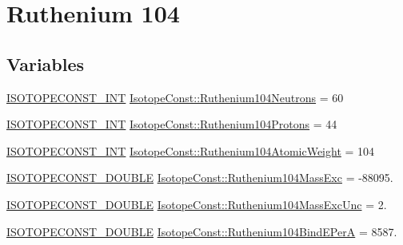 \hypertarget{group___isotope_const-_ruthenium-_ru104}{}\section{Ruthenium 104}
\label{group___isotope_const-_ruthenium-_ru104}
\subsection*{Variables}
\begin{DoxyCompactItemize}
\item 
\mbox{\hyperlink{group___isotope_const-_macros_ga5f18360b3e99483a35c32d789e62621c}{I\+S\+O\+T\+O\+P\+E\+C\+O\+N\+S\+T\+\_\+\+I\+NT}} \mbox{\hyperlink{group___isotope_const-_ruthenium-_ru104_ga290d6c23257a478cd0587c20491e41c3}{Isotope\+Const\+::\+Ruthenium104\+Neutrons}} = 60
\item 
\mbox{\hyperlink{group___isotope_const-_macros_ga5f18360b3e99483a35c32d789e62621c}{I\+S\+O\+T\+O\+P\+E\+C\+O\+N\+S\+T\+\_\+\+I\+NT}} \mbox{\hyperlink{group___isotope_const-_ruthenium-_ru104_gae25937feedf29162c135adbff67fa4ce}{Isotope\+Const\+::\+Ruthenium104\+Protons}} = 44
\item 
\mbox{\hyperlink{group___isotope_const-_macros_ga5f18360b3e99483a35c32d789e62621c}{I\+S\+O\+T\+O\+P\+E\+C\+O\+N\+S\+T\+\_\+\+I\+NT}} \mbox{\hyperlink{group___isotope_const-_ruthenium-_ru104_ga3aaffc4020ab8aff445eb86447915461}{Isotope\+Const\+::\+Ruthenium104\+Atomic\+Weight}} = 104
\item 
\mbox{\hyperlink{group___isotope_const-_macros_ga8f45a7272ce02c0b4c65c44636ed719a}{I\+S\+O\+T\+O\+P\+E\+C\+O\+N\+S\+T\+\_\+\+D\+O\+U\+B\+LE}} \mbox{\hyperlink{group___isotope_const-_ruthenium-_ru104_ga5640dce6df083ca30ce2f1fa25010c27}{Isotope\+Const\+::\+Ruthenium104\+Mass\+Exc}} = -\/88095.
\item 
\mbox{\hyperlink{group___isotope_const-_macros_ga8f45a7272ce02c0b4c65c44636ed719a}{I\+S\+O\+T\+O\+P\+E\+C\+O\+N\+S\+T\+\_\+\+D\+O\+U\+B\+LE}} \mbox{\hyperlink{group___isotope_const-_ruthenium-_ru104_ga5da6a0821c9875a582522159d195929f}{Isotope\+Const\+::\+Ruthenium104\+Mass\+Exc\+Unc}} = 2.
\item 
\mbox{\hyperlink{group___isotope_const-_macros_ga8f45a7272ce02c0b4c65c44636ed719a}{I\+S\+O\+T\+O\+P\+E\+C\+O\+N\+S\+T\+\_\+\+D\+O\+U\+B\+LE}} \mbox{\hyperlink{group___isotope_const-_ruthenium-_ru104_gae0786d2ef7b8e39e8d7f3939766b7192}{Isotope\+Const\+::\+Ruthenium104\+Bind\+E\+PerA}} = 8587.
\item 

\end{DoxyCompactItemize}
